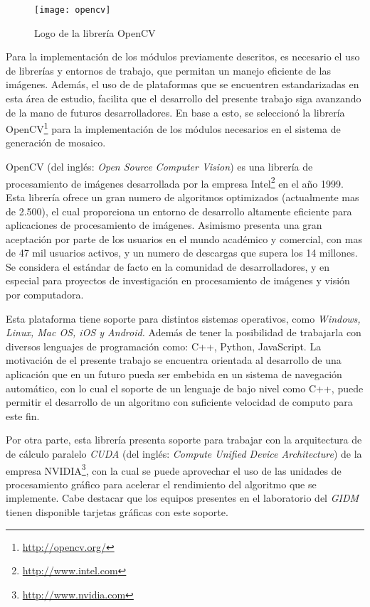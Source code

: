 \begin{wrapfigure}{R}{5cm}
	\begin{center}
		\vspace*{-0.2in}
		\texttt{[image: opencv]}
	\end{center}
	\caption{Logo de la librería OpenCV}
\end{wrapfigure}

Para la implementación de los módulos previamente descritos, es necesario el uso de librerías y entornos de trabajo, que permitan un manejo eficiente de las imágenes. Además, el uso de de plataformas que se encuentren estandarizadas en esta área de estudio, facilita que el desarrollo del presente trabajo siga avanzando de la mano de futuros desarrolladores. En base a esto, se seleccionó la librería OpenCV\footnote{\url{http://opencv.org/}} para la implementación de los módulos necesarios en el sistema de generación de mosaico.

OpenCV (del inglés: \textit{Open Source Computer Vision}) es una librería de procesamiento de imágenes desarrollada por la empresa Intel\footnote{\url{http://www.intel.com}} en el año 1999. Esta librería ofrece un gran numero de algoritmos optimizados (actualmente mas de 2.500), el cual proporciona un entorno de desarrollo altamente eficiente para aplicaciones de procesamiento de imágenes. Asimismo presenta una gran aceptación por parte de los usuarios en el mundo académico y comercial, con mas de 47 mil usuarios activos, y un numero de descargas que supera los 14 millones. Se considera el estándar de facto en la comunidad de desarrolladores, y en especial para proyectos de investigación en procesamiento de imágenes y visión por computadora. 

Esta plataforma tiene soporte para distintos sistemas operativos, como \textit{Windows, Linux, Mac OS, iOS y Android.} Además de tener la posibilidad de trabajarla con diversos lenguajes de programación como: C++, Python, JavaScript. La motivación de el presente trabajo se encuentra orientada al desarrollo de una aplicación que en un futuro pueda ser embebida en un sistema de navegación automático, con lo cual el soporte de un lenguaje de bajo nivel como C++, puede permitir el desarrollo de un algoritmo con suficiente velocidad de computo para este fin.

Por otra parte, esta librería presenta soporte para trabajar con la arquitectura de de cálculo paralelo \textit{CUDA} (del inglés: \textit{Compute Unified Device Architecture}) de la empresa NVIDIA\footnote{\url{http://www.nvidia.com}}, con la cual se puede aprovechar el uso de las unidades de procesamiento gráfico para acelerar el rendimiento del algoritmo que se implemente. Cabe destacar que los equipos presentes en el laboratorio del \textit{GIDM} tienen disponible tarjetas gráficas con este soporte.

